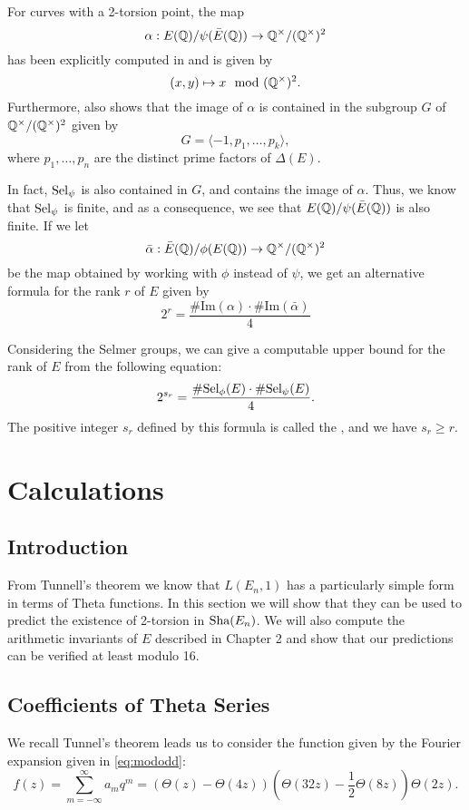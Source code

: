 \documentclass[12pt, a4paper]{report}
\begin{document}
For curves with a 2-torsion point, the map 
$$\alpha : E({\mathbb Q}) / \psi(\bar{E}({\mathbb Q})) \rightarrow {\mathbb Q}^\times / ({\mathbb Q}^\times)^2$$ has been
explicitly computed in \cite[Page 91]{rational} and
is given by
$$(x,y) \mapsto x \mod ({\mathbb Q}^\times)^2.$$
Furthermore, \cite[Pages 85-87]{rational} also shows that the image of $\alpha$ is
contained in the subgroup $G$ of ${\mathbb Q}^\times / ({\mathbb Q}^\times)^2$ given by 
\[G = \langle -1, p_1, \dots, p_k  \rangle,\]
where $p_1, \dots, p_n$ are the distinct prime factors of $\Delta(E).$

In fact, $\text{\normalfont Sel}_\psi$ is also contained in $G$, and contains the image of $\alpha$. Thus,
we know that $\text{\normalfont Sel}_\psi$ is finite, and as a consequence, we see that
$E({\mathbb Q})/\psi(\bar{E}({\mathbb Q}))$ is also finite. If we let $$\bar{\alpha} :
\bar{E}({\mathbb Q}) / \phi (E({\mathbb Q})) \rightarrow {\mathbb Q}^\times / ({\mathbb Q}^\times)^2$$ be the map
obtained by working with $\phi$ instead of $\psi$, we get an alternative
formula for the rank $r$ of $E$ given by
\[2^r = \frac{\# \text{Im}(\alpha) \cdot \# \text{Im}(\bar{\alpha})}{4}\]

Considering the Selmer groups, we can give a computable upper bound for the rank
of $E$ from the following equation:
\[2^{s_r} = \frac{\# \text{\normalfont Sel}_\phi(E) \cdot \# \text{\normalfont Sel}_\psi(E)}{4}.\]
The positive integer $s_r$ defined by this formula 
is called the , and we have $s_r \geq r.$

\newpage

\chapter{Calculations}

\section{Introduction}

From Tunnell's theorem we know that $L(E_n,1)$ has a particularly simple
form in terms of Theta functions. In this section we will show that they can be
used to predict the existence of 2-torsion in $\text{\normalfont Sha}(E_n)$. We will also compute
the arithmetic invariants of $E$ described in Chapter 2 and show that our
predictions can be verified at least modulo 16.


\section{Coefficients of Theta Series}
We recall Tunnel's theorem leads us to consider the function given by the
Fourier expansion given in \autoref{eq:mododd}:
\[
  f(z) = \sum\limits_{m=-\infty}^\infty a_m q^m
  = (\Theta(z) - \Theta(4z)) \left(\Theta(32z)-\frac{1}{2} \Theta(8z)\right) \Theta(2z).
\]
\end{document}
